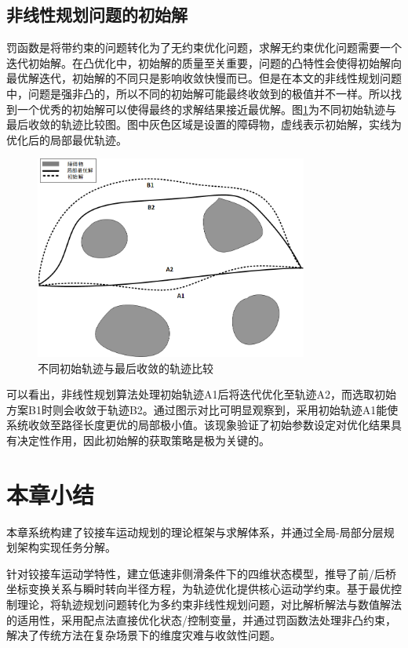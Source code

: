 \documentclass[master,academic]{ysuthesis} %
\begin{document}
		\subsection{非线性规划问题的初始解}
		罚函数是将带约束的问题转化为了无约束优化问题，求解无约束优化问题需要一个迭代初始解。在凸优化中，初始解的质量至关重要，问题的凸特性会使得初始解向最优解迭代，初始解的不同只是影响收敛快慢而已。但是在本文的非线性规划问题中，问题是强非凸的，所以不同的初始解可能最终收敛到的极值并不一样。所以找到一个优秀的初始解可以使得最终的求解结果接近最优解。图\ref{fig:不同初解}为不同初始轨迹与最后收敛的轨迹比较图。图中灰色区域是设置的障碍物，虚线表示初始解，实线为优化后的局部最优轨迹。
		\begin{figure}[H]
			\centering
			\includegraphics[width=0.8\textwidth]{不同初解.png}
			\caption{不同初始轨迹与最后收敛的轨迹比较}
			\label{fig:不同初解}
		\end{figure}
		可以看出，非线性规划算法处理初始轨迹A1后将迭代优化至轨迹A2，而选取初始方案B1时则会收敛于轨迹B2。通过图示对比可明显观察到，采用初始轨迹A1能使系统收敛至路径长度更优的局部极小值。该现象验证了初始参数设定对优化结果具有决定性作用，因此初始解的获取策略是极为关键的。

	\section{本章小结}
	本章系统构建了铰接车运动规划的理论框架与求解体系，并通过全局-局部分层规划架构实现任务分解。

	针对铰接车运动学特性，建立低速非侧滑条件下的四维状态模型，推导了前/后桥坐标变换关系与瞬时转向半径方程，为轨迹优化提供核心运动学约束。基于最优控制理论，将轨迹规划问题转化为多约束非线性规划问题，对比解析解法与数值解法的适用性，采用配点法直接优化状态/控制变量，并通过罚函数法处理非凸约束，解决了传统方法在复杂场景下的维度灾难与收敛性问题。
\end{document}
